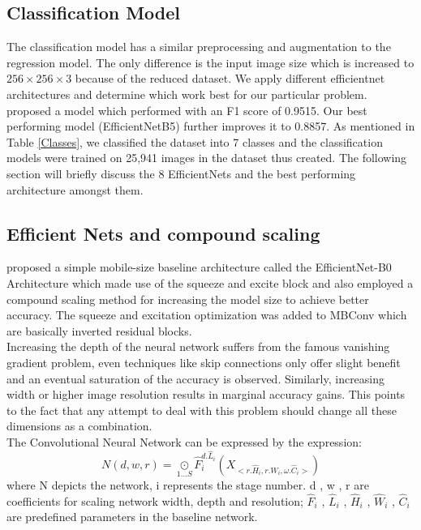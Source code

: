 \documentclass[fleqn,usenatbib]{mnras}
\begin{document}
\subsection{Classification Model}
\hspace{0.25 in}The classification model has a similar preprocessing and augmentation to the regression model. The only difference is the input image size which is increased to $256\times256\times3$ because of the reduced dataset. We apply different efficientnet architectures and determine which work best for our particular problem.
\citet{dai2018galaxy} proposed a model which performed with an F1 score of 0.9515. Our best performing model (EfficientNetB5) further improves it to 0.8857.
As mentioned in Table \ref{Classes}, we classified the dataset into 7 classes and the classification models were trained on 25,941 images in the dataset thus created. The following section will briefly discuss the 8 EfficientNets and the best performing architecture amongst them.
\subsection{Efficient Nets and compound scaling}
\hspace{0.25 in} \citet{efficientnet} proposed a simple mobile-size baseline architecture called the EfficientNet-B0 Architecture which made use of the squeeze and excite block and also employed a compound scaling method for increasing the model size to achieve better accuracy. The squeeze and excitation optimization was added to MBConv which are basically inverted residual blocks.\\
\hspace*{0.25 in}Increasing the depth of the neural network suffers from the famous vanishing gradient problem, even techniques like skip connections only offer slight benefit and an eventual saturation of the accuracy is observed. Similarly, increasing width or higher image resolution results in marginal accuracy gains. This points to the fact that any attempt to deal with this problem should change all these dimensions as a combination.\\
The Convolutional Neural Network can be expressed by the expression:
\begin{equation}
    N(d,w,r)= \underset{1...S}{\odot}  \hat{F}_{i}^{d.\hat{L}_{i}} (X_{<r.\hat{H}_{i} , r.\hat{W}_{i} , \omega.\hat{C}_{i} >} )
\end{equation}
where N depicts the network, i represents the stage number. d , w , r are coefficients for scaling network width, depth and resolution; ${ \hat{F}_{i} }$ , ${ \hat{L}_{i} }$ , ${ \hat{H}_{i} }$ , ${ \hat{W}_{i} }$ , ${ \hat{C}_{i} }$  are predefined parameters in the baseline network.\\
\end{document}
